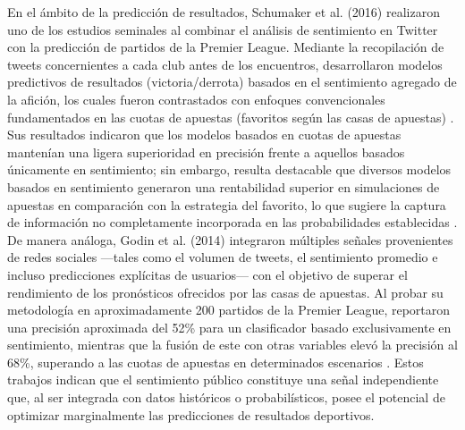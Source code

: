 En el ámbito de la predicción de resultados, Schumaker et al. (2016) realizaron uno de los estudios seminales al combinar el análisis de sentimiento en Twitter con la predicción de partidos de la Premier League. Mediante la recopilación de tweets concernientes a cada club antes de los encuentros, desarrollaron modelos predictivos de resultados (victoria/derrota) basados en el sentimiento agregado de la afición, los cuales fueron contrastados con enfoques convencionales fundamentados en las cuotas de apuestas (favoritos según las casas de apuestas) \cite{Schumaker2016}. Sus resultados indicaron que los modelos basados en cuotas de apuestas mantenían una ligera superioridad en precisión frente a aquellos basados únicamente en sentimiento; sin embargo, resulta destacable que diversos modelos basados en sentimiento generaron una rentabilidad superior en simulaciones de apuestas en comparación con la estrategia del favorito, lo que sugiere la captura de información no completamente incorporada en las probabilidades establecidas \cite{Selak2024}. De manera análoga, Godin et al. (2014) integraron múltiples señales provenientes de redes sociales —tales como el volumen de tweets, el sentimiento promedio e incluso predicciones explícitas de usuarios— con el objetivo de superar el rendimiento de los pronósticos ofrecidos por las casas de apuestas. Al probar su metodología en aproximadamente 200 partidos de la Premier League, reportaron una precisión aproximada del 52\% para un clasificador basado exclusivamente en sentimiento, mientras que la fusión de este con otras variables elevó la precisión al 68\%, superando a las cuotas de apuestas en determinados escenarios \cite{Selak2024}. Estos trabajos indican que el sentimiento público constituye una señal independiente que, al ser integrada con datos históricos o probabilísticos, posee el potencial de optimizar marginalmente las predicciones de resultados deportivos.\\

